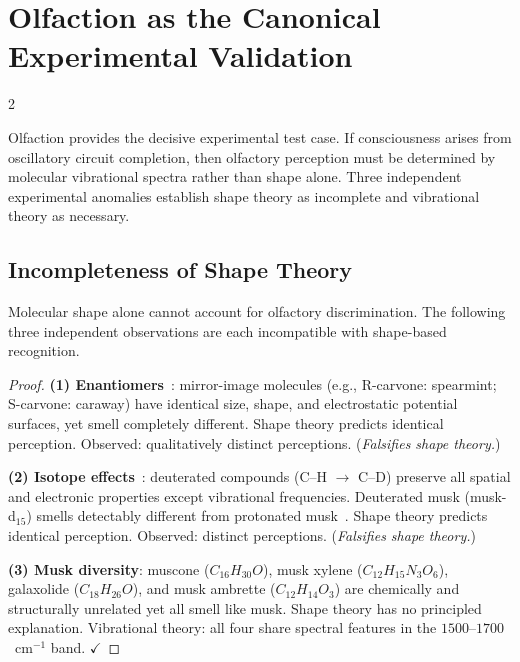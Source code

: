 \section{Olfaction as the Canonical Experimental Validation}
\label{sec:cc_olfaction}

\begin{multicols}{2}

Olfaction provides the decisive experimental test case.  If consciousness
arises from oscillatory circuit completion, then olfactory perception must
be determined by molecular vibrational spectra rather than shape alone.
Three independent experimental anomalies establish shape theory as
incomplete and vibrational theory as necessary.

\subsection{Incompleteness of Shape Theory}
\label{ssec:shape_incomplete}

\begin{theorem}
\label{thm:shape_incompleteness}
Molecular shape alone cannot account for olfactory discrimination.  The
following three independent observations are each incompatible with
shape-based recognition.
\end{theorem}

\begin{proof}
\textbf{(1) Enantiomers}~\citep{amoore1964stereochemical}: mirror-image
molecules (e.g., R-carvone: spearmint; S-carvone: caraway) have identical
size, shape, and electrostatic potential surfaces, yet smell completely
different.  Shape theory predicts identical perception.  Observed:
qualitatively distinct perceptions.  (\emph{Falsifies shape theory.})

\textbf{(2) Isotope effects}~\citep{gane2013molecular}: deuterated compounds
(C--H $\to$ C--D) preserve all spatial and electronic properties except
vibrational frequencies.  Deuterated musk (musk-d$_{15}$) smells detectably
different from protonated musk~\citep{franco2011deuterium}.
Shape theory predicts identical perception.  Observed: distinct perceptions.  (\emph{Falsifies shape theory.})

\textbf{(3) Musk diversity}: muscone ($C_{16}H_{30}O$), musk xylene
($C_{12}H_{15}N_3O_6$), galaxolide ($C_{18}H_{26}O$), and musk ambrette
($C_{12}H_{14}O_3$) are chemically and structurally unrelated yet all smell
like musk.  Shape theory has no principled explanation.  Vibrational theory:
all four share spectral features in the $1500$--$1700$~cm$^{-1}$ band. $\checkmark$


\end{proof}
\end{multicols}

